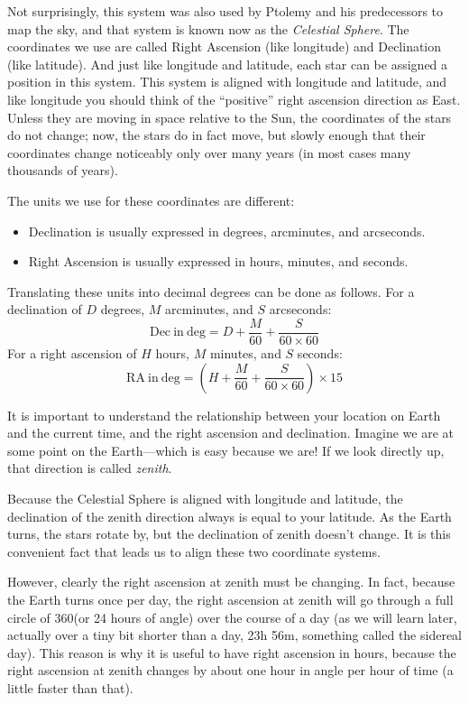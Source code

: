 \documentclass[12pt, preprint]{aastex}
\begin{document}
Not surprisingly, this system was also used by Ptolemy and his
predecessors to map the sky, and that system is known now as the {\it
  Celestial Sphere}. The coordinates we use are called Right Ascension
(like longitude) and Declination (like latitude). And just like
longitude and latitude, each star can be assigned a position in this
system.  This system is aligned with longitude and latitude, and like
longitude you should think of the ``positive'' right ascension
direction as East.  Unless they are moving in space relative to the
Sun, the coordinates of the stars do not change; now, the stars do in
fact move, but slowly enough that their coordinates change noticeably
only over many years (in most cases many thousands of years).

The units we use for these coordinates are different:
\begin{itemize}
\item Declination is usually expressed in degrees, arcminutes, and
  arcseconds.
\item Right Ascension is usually expressed in hours, minutes, and
  seconds.
\end{itemize}
Translating these units into decimal degrees can be done as
follows. For a declination of $D$ degrees, $M$ arcminutes, and $S$
arcseconds:
\begin{equation}
\label{eq:decdegunits}
\mathrm{Dec~in~deg} = D + \frac{M}{60} + \frac{S}{60\times 60}
\end{equation}
For a right ascension of $H$ hours, $M$ minutes, and $S$ seconds:
\begin{equation}
\label{eq:radegunits}
\mathrm{RA~in~deg} = \left(H+ \frac{M}{60} + \frac{S}{60\times
  60}\right)\times 15
\end{equation}

It is important to understand the relationship between your location
on Earth and the current time, and the right ascension and
declination. Imagine we are at some point on the Earth---which is easy
because we are! If we look directly up, that direction is called {\it
  zenith}.

Because the Celestial Sphere is aligned with longitude and latitude,
the declination of the zenith  direction always is equal to your
latitude. As the Earth turns, the stars rotate by, but the declination
of zenith doesn't change. It is this convenient fact that leads us to
align these two coordinate systems.

However, clearly the right ascension at zenith must be changing. In
fact, because the Earth turns once per day, the right ascension at
zenith will go through a full circle of 360\degree (or 24 hours of
angle) over the course of a day (as we will learn later, actually over
a tiny bit shorter than a day, 23h 56m, something called the sidereal
day). This reason is why it is useful to have right ascension in
hours, because the right ascension at zenith changes by about one hour
in angle per hour of time (a little faster than that).
\end{document}
